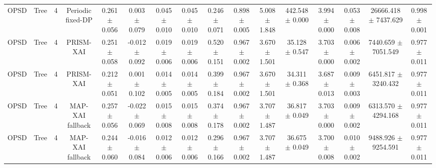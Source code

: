 \begin{tabular}{lccccccccccccccc}
OPSD & Tree & 4 & Periodic fixed-DP & 0.261 $\pm$ 0.056 & 0.003 $\pm$ 0.079 & 0.045 $\pm$ 0.010 & 0.045 $\pm$ 0.010 & 0.246 $\pm$ 0.071 & 0.898 $\pm$ 0.005 & 5.008 $\pm$ 1.848 & 442.548 $\pm$ 0.000 & 3.994 $\pm$ 0.000 & 0.053 $\pm$ 0.008 & 26666.418 $\pm$ 7437.629 & 0.998 $\pm$ 0.001 \\
OPSD & Tree & 4 & PRISM-XAI & 0.251 $\pm$ 0.058 & -0.012 $\pm$ 0.092 & 0.019 $\pm$ 0.006 & 0.019 $\pm$ 0.006 & 0.520 $\pm$ 0.151 & 0.967 $\pm$ 0.002 & 3.670 $\pm$ 1.501 & 35.128 $\pm$ 0.547 & 3.703 $\pm$ 0.000 & 0.006 $\pm$ 0.002 & 7440.659 $\pm$ 7051.549 & 0.977 $\pm$ 0.011 \\
OPSD & Tree & 4 & PRISM-XAI & 0.212 $\pm$ 0.051 & 0.001 $\pm$ 0.102 & 0.014 $\pm$ 0.005 & 0.014 $\pm$ 0.005 & 0.399 $\pm$ 0.184 & 0.967 $\pm$ 0.002 & 3.670 $\pm$ 1.501 & 34.311 $\pm$ 0.368 & 3.687 $\pm$ 0.013 & 0.009 $\pm$ 0.003 & 6451.817 $\pm$ 3240.432 & 0.977 $\pm$ 0.011 \\
OPSD & Tree & 4 & MAP-XAI fallback & 0.257 $\pm$ 0.056 & -0.022 $\pm$ 0.069 & 0.015 $\pm$ 0.008 & 0.015 $\pm$ 0.008 & 0.374 $\pm$ 0.178 & 0.967 $\pm$ 0.002 & 3.707 $\pm$ 1.487 & 36.817 $\pm$ 0.049 & 3.703 $\pm$ 0.000 & 0.009 $\pm$ 0.002 & 6313.570 $\pm$ 4294.168 & 0.977 $\pm$ 0.011 \\
OPSD & Tree & 4 & MAP-XAI fallback & 0.244 $\pm$ 0.060 & -0.016 $\pm$ 0.084 & 0.012 $\pm$ 0.006 & 0.012 $\pm$ 0.006 & 0.296 $\pm$ 0.166 & 0.967 $\pm$ 0.002 & 3.707 $\pm$ 1.487 & 36.675 $\pm$ 0.049 & 3.700 $\pm$ 0.008 & 0.010 $\pm$ 0.002 & 9488.926 $\pm$ 9254.591 & 0.977 $\pm$ 0.011 \\
\bottomrule
\end{tabular}
